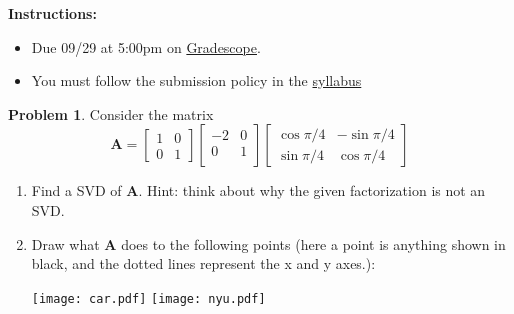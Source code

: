 \documentclass[12pt]{article}
\theoremstyle{definition}
\newtheorem{problem}{Problem}
\renewcommand{\vec}{\mathbf}
\begin{document}
\textbf{\Large{}}
    
    \vspace{-1.8em}
    \hrulefill
 
\textbf{Instructions:}
    \begin{itemize}
        \item Due 09/29 at 5:00pm on \href{https://www.gradescope.com/courses/570477/}{Gradescope}.
        \item You must follow the submission policy in the \href{https://courses.chen.pw/na_f2023/syllabus.html}{syllabus} 
\end{itemize}
   
\vspace{5em}



\begin{problem}
Consider the matrix 
    \[
        \vec{A} 
        = 
        \begin{bmatrix}
            1 & 0 \\
            0 & 1
        \end{bmatrix}
        \begin{bmatrix}
            -2 & 0 \\ 0 & 1 \\
        \end{bmatrix}
        \begin{bmatrix}
            \cos \pi/4 & -\sin \pi/4 \\
            \sin \pi/4 & \cos \pi/4
        \end{bmatrix}
    \]
    \begin{enumerate}
        \item Find a SVD of $\vec{A}$. Hint: think about why the given factorization is not an SVD.
        \item Draw what $\vec{A}$ does to the following points (here a point is anything shown in black, and the dotted lines represent the x and y axes.):
            
        \texttt{[image: car.pdf]}
        \hfill
        \texttt{[image: nyu.pdf]}
    
    \end{enumerate}

\end{problem}

\hfill
\end{document}
